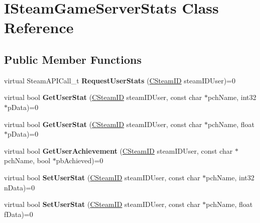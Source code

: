 \hypertarget{classISteamGameServerStats}{}\section{I\+Steam\+Game\+Server\+Stats Class Reference}
\label{classISteamGameServerStats}
\subsection*{Public Member Functions}
\begin{DoxyCompactItemize}
\item 
\hypertarget{classISteamGameServerStats_aa26cc575764280c12b452c6dda4dc33d}{}virtual Steam\+A\+P\+I\+Call\+\_\+t {\bfseries Request\+User\+Stats} (\hyperlink{classCSteamID}{C\+Steam\+I\+D} steam\+I\+D\+User)=0\label{classISteamGameServerStats_aa26cc575764280c12b452c6dda4dc33d}

\item 
\hypertarget{classISteamGameServerStats_a745c30c85cd1282d25f2cca2646a5d60}{}virtual bool {\bfseries Get\+User\+Stat} (\hyperlink{classCSteamID}{C\+Steam\+I\+D} steam\+I\+D\+User, const char $\ast$pch\+Name, int32 $\ast$p\+Data)=0\label{classISteamGameServerStats_a745c30c85cd1282d25f2cca2646a5d60}

\item 
\hypertarget{classISteamGameServerStats_ae37220e5cbd22b43644a8b2fd6cbfda1}{}virtual bool {\bfseries Get\+User\+Stat} (\hyperlink{classCSteamID}{C\+Steam\+I\+D} steam\+I\+D\+User, const char $\ast$pch\+Name, float $\ast$p\+Data)=0\label{classISteamGameServerStats_ae37220e5cbd22b43644a8b2fd6cbfda1}

\item 
\hypertarget{classISteamGameServerStats_ae5f352ac462b7829df350a15effce7ce}{}virtual bool {\bfseries Get\+User\+Achievement} (\hyperlink{classCSteamID}{C\+Steam\+I\+D} steam\+I\+D\+User, const char $\ast$pch\+Name, bool $\ast$pb\+Achieved)=0\label{classISteamGameServerStats_ae5f352ac462b7829df350a15effce7ce}

\item 
\hypertarget{classISteamGameServerStats_a5646a2191e05907f4d7ab3a89a648197}{}virtual bool {\bfseries Set\+User\+Stat} (\hyperlink{classCSteamID}{C\+Steam\+I\+D} steam\+I\+D\+User, const char $\ast$pch\+Name, int32 n\+Data)=0\label{classISteamGameServerStats_a5646a2191e05907f4d7ab3a89a648197}

\item 
\hypertarget{classISteamGameServerStats_ac20f928e3fdf37e0772856bebb71c4d1}{}virtual bool {\bfseries Set\+User\+Stat} (\hyperlink{classCSteamID}{C\+Steam\+I\+D} steam\+I\+D\+User, const char $\ast$pch\+Name, float f\+Data)=0\label{classISteamGameServerStats_ac20f928e3fdf37e0772856bebb71c4d1}


\end{DoxyCompactItemize}
